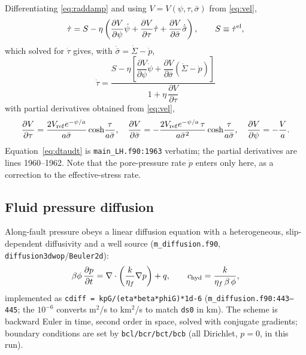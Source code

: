 \documentclass[11pt]{article}
\newcommand{\code}[1]{\texttt{#1}}
\newcommand{\sigeff}{\bar{\sigma}}
\newcommand{\sigtot}{\Sigma}
\begin{document}
Differentiating \eqref{eq:raddamp} and using
$V=V(\psi,\tau,\sigeff)$ from \eqref{eq:vel},
\begin{equation}
  \dot\tau = S - \eta\left(
    \frac{\partial V}{\partial \psi}\dot\psi
    + \frac{\partial V}{\partial \tau}\dot\tau
    + \frac{\partial V}{\partial \sigeff}\dot{\sigeff}
  \right),
  \qquad S \equiv \dot\tau^{\rm el},
\end{equation}
which solved for $\dot\tau$ gives, with $\dot{\sigeff} = \dot\sigtot - \dot p$,
\begin{equation}
  \boxed{\;
  \dot\tau =
  \frac{S - \eta\left[\dfrac{\partial V}{\partial\psi}\dot\psi
         + \dfrac{\partial V}{\partial\sigeff}\left(\dot\sigtot - \dot p\right)\right]}
       {1 + \eta\,\dfrac{\partial V}{\partial\tau}}\;}
  \label{eq:dtaudt}
\end{equation}
with partial derivatives obtained from \eqref{eq:vel},
\begin{equation}
  \frac{\partial V}{\partial\tau} = \frac{2V_{\rm ref}e^{-\psi/a}}{a\sigeff}
    \cosh\!\frac{\tau}{a\sigeff},
  \quad
  \frac{\partial V}{\partial\sigeff} = -\frac{2V_{\rm ref}e^{-\psi/a}\,\tau}
    {a\sigeff^{2}}\cosh\!\frac{\tau}{a\sigeff},
  \quad
  \frac{\partial V}{\partial\psi} = -\frac{V}{a}.
\end{equation}
Equation~\eqref{eq:dtaudt} is \code{main\_LH.f90:1963} verbatim; the partial
derivatives are lines 1960--1962. Note that the pore-pressure rate $\dot p$
enters only here, as a correction to the effective-stress rate.

\subsection{Fluid pressure diffusion}

Along-fault pressure obeys a linear diffusion equation with a heterogeneous,
slip-dependent diffusivity and a well source
(\code{m\_diffusion.f90}, \code{diffusion3dwop}/\code{Beuler2d}):
\begin{equation}
  \beta\phi\,\frac{\partial p}{\partial t}
  = \nabla\cdot\left(\frac{k}{\eta_f}\nabla p\right) + q ,
  \qquad
  c_{\rm hyd} = \frac{k}{\eta_f\,\beta\,\phi},
  \label{eq:diffusion}
\end{equation}
implemented as \code{cdiff = kpG/(eta*beta*phiG)*1d-6}
(\code{m\_diffusion.f90:443--445}; the $10^{-6}$ converts m$^2$/s to
km$^2$/s to match \code{ds0} in km). The scheme is backward Euler in time,
second order in space, solved with conjugate gradients; boundary conditions
are set by \code{bcl/bcr/bct/bcb} (all Dirichlet, $p=0$, in this run).
\end{document}
